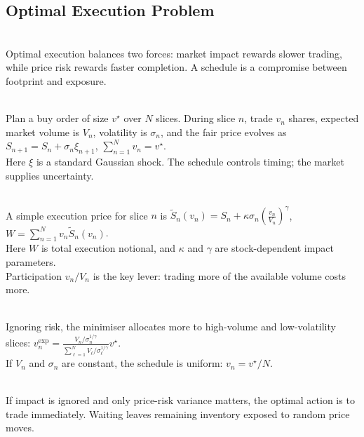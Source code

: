 \subsection{Optimal Execution Problem}

\begin{principle} \\
Optimal execution balances two forces: market impact rewards slower trading, while price risk rewards faster completion. A schedule is a compromise between footprint and exposure.
\end{principle}

\begin{model} \\
Plan a buy order of size $v^\star$ over $N$ slices. During slice $n$, trade $v_n$ shares, expected market volume is $V_n$, volatility is $\sigma_n$, and the fair price evolves as $S_{n+1}=S_n+\sigma_n\xi_{n+1}$, $\sum\limits_{n=1}^{N}v_n=v^\star$.\\
Here $\xi$ is a standard Gaussian shock. The schedule controls timing; the market supplies uncertainty.
\end{model}

\begin{model} \\
A simple execution price for slice $n$ is $\widetilde{S}_n(v_n)=S_n+\kappa\sigma_n\left(\frac{v_n}{V_n}\right)^\gamma$, $W=\sum\limits_{n=1}^{N}v_n\widetilde{S}_n(v_n)$.\\
Here $W$ is total execution notional, and $\kappa$ and $\gamma$ are stock-dependent impact parameters.\\
Participation $v_n/V_n$ is the key lever: trading more of the available volume costs more.
\end{model}

\begin{definition} \\
Ignoring risk, the minimiser allocates more to high-volume and low-volatility slices: $v_n^{\mathrm{exp}} =\frac{V_n/\sigma_n^{1/\gamma}}{\sum\limits_{\ell=1}^{N}V_\ell/\sigma_\ell^{1/\gamma}}v^\star$.\\
If $V_n$ and $\sigma_n$ are constant, the schedule is uniform: $v_n=v^\star/N$.
\end{definition}

\begin{mechanism} \\
If impact is ignored and only price-risk variance matters, the optimal action is to trade immediately. Waiting leaves remaining inventory exposed to random price moves.
\end{mechanism}

